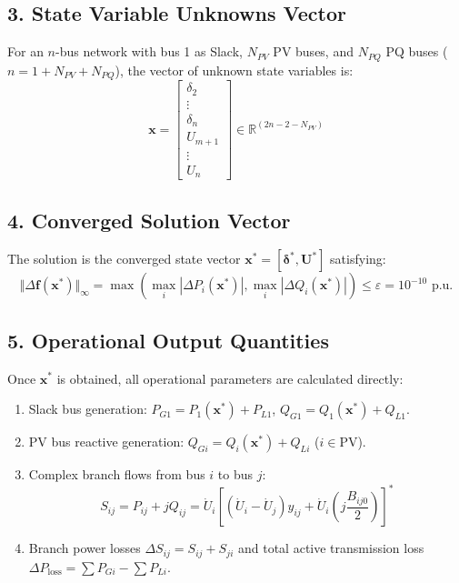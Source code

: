 \documentclass[12pt,a4paper,oneside]{report}
\begin{document}
\subsection{3. State Variable Unknowns Vector}
For an $n$-bus network with bus 1 as Slack, $N_{PV}$ PV buses, and $N_{PQ}$ PQ buses ($n = 1 + N_{PV} + N_{PQ}$), the vector of unknown state variables is:
\begin{equation}
\mathbf{x} = 
\begin{bmatrix}
\delta_2 \\
\vdots \\
\delta_n \\
U_{m+1} \\
\vdots \\
U_n
\end{bmatrix}
\in \mathbb{R}^{(2n - 2 - N_{PV})}
\end{equation}

\subsection{4. Converged Solution Vector}
The solution is the converged state vector $\mathbf{x}^* = [\boldsymbol{\delta}^*, \mathbf{U}^*]$ satisfying:
\begin{equation}
\Vert \Delta \mathbf{f}(\mathbf{x}^*) \Vert_\infty = \max \left( \max_{i} |\Delta P_i(\mathbf{x}^*)|, \max_{i} |\Delta Q_i(\mathbf{x}^*)| \right) \le \varepsilon = 10^{-10}\text{ p.u.}
\end{equation}

\subsection{5. Operational Output Quantities}
Once $\mathbf{x}^*$ is obtained, all operational parameters are calculated directly:
\begin{enumerate}
    \item Slack bus generation: $P_{G1} = P_1(\mathbf{x}^*) + P_{L1}$, $Q_{G1} = Q_1(\mathbf{x}^*) + Q_{L1}$.
    \item PV bus reactive generation: $Q_{Gi} = Q_i(\mathbf{x}^*) + Q_{Li}$ ($i \in \text{PV}$).
    \item Complex branch flows from bus $i$ to bus $j$:
    \begin{equation}
    S_{ij} = P_{ij} + jQ_{ij} = \dot{U}_i \left[ (\dot{U}_i - \dot{U}_j) y_{ij} + \dot{U}_i \left( j \frac{B_{ij0}}{2} \right) \right]^*
    \end{equation}
    \item Branch power losses $\Delta S_{ij} = S_{ij} + S_{ji}$ and total active transmission loss $\Delta P_{\text{loss}} = \sum P_{Gi} - \sum P_{Li}$.
\end{enumerate}
\end{document}
